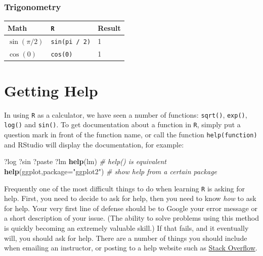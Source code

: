 \documentclass[]{book}
\newenvironment{Shaded}{\begin{snugshade}}{\end{snugshade}}
\newcommand{\KeywordTok}[1]{\textcolor[rgb]{0.13,0.29,0.53}{\textbf{#1}}}
\newcommand{\DataTypeTok}[1]{\textcolor[rgb]{0.13,0.29,0.53}{#1}}
\newcommand{\StringTok}[1]{\textcolor[rgb]{0.31,0.60,0.02}{#1}}
\newcommand{\CommentTok}[1]{\textcolor[rgb]{0.56,0.35,0.01}{\textit{#1}}}
\newcommand{\NormalTok}[1]{#1}
\theoremstyle{definition}
\theoremstyle{definition}
\theoremstyle{definition}
\theoremstyle{remark}
\begin{document}
\subsubsection*{Trigonometry}\label{trigonometry}

\begin{longtable}[]{@{}lll@{}}
\toprule
Math & \texttt{R} & Result\tabularnewline
\midrule
\endhead
\(\sin(\pi / 2)\) & \texttt{sin(pi\ /\ 2)} & 1\tabularnewline
\(\cos(0)\) & \texttt{cos(0)} & 1\tabularnewline
\bottomrule
\end{longtable}

\section{Getting Help}\label{getting-help}

In using \texttt{R} as a calculator, we have seen a number of functions:
\texttt{sqrt()}, \texttt{exp()}, \texttt{log()} and \texttt{sin()}. To
get documentation about a function in \texttt{R}, simply put a question
mark in front of the function name, or call the function
\texttt{help(function)} and RStudio will display the documentation, for
example:

\begin{Shaded}
\begin{Highlighting}[]
\NormalTok{?log}
\NormalTok{?sin}
\NormalTok{?paste}
\NormalTok{?lm}
\KeywordTok{help}\NormalTok{(lm)   }\CommentTok{# help() is equivalent}
\KeywordTok{help}\NormalTok{(ggplot,}\DataTypeTok{package=}\StringTok{"ggplot2"}\NormalTok{)  }\CommentTok{# show help from a certain package}
\end{Highlighting}
\end{Shaded}

Frequently one of the most difficult things to do when learning
\texttt{R} is asking for help. First, you need to decide to ask for
help, then you need to know \emph{how} to ask for help. Your very first
line of defense should be to Google your error message or a short
description of your issue. (The ability to solve problems using this
method is quickly becoming an extremely valuable skill.) If that fails,
and it eventually will, you should ask for help. There are a number of
things you should include when emailing an instructor, or posting to a
help website such as \href{https://stackoverflow.com}{Stack Overflow}.
\end{document}
